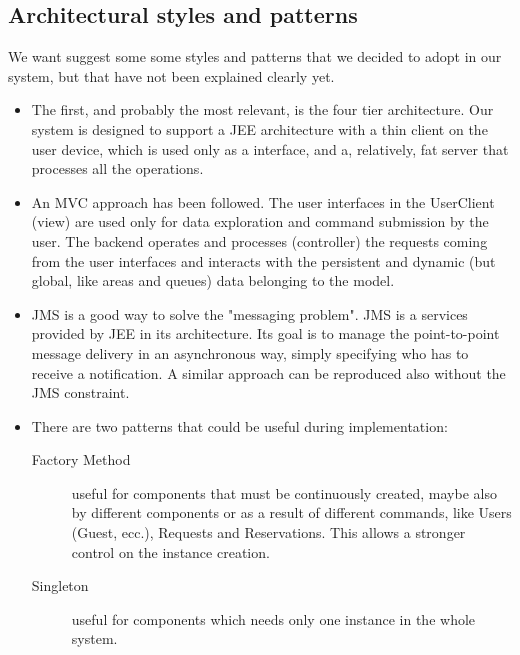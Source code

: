 	\subsection{Architectural styles and patterns}
	We want suggest some some styles and patterns that we decided to adopt in our system, but that have not been explained
	clearly yet.
	\begin{itemize}
		\item The first, and probably the most relevant, is the four tier architecture. Our system is designed to
		support a JEE architecture with a thin client on the user device, which is used only as a interface, and a,
		relatively, fat server that processes all the operations.
		\item An MVC approach has been followed. The user interfaces in the UserClient (view) are used only for
		data exploration and command submission by the user.
		The backend operates and processes (controller) the requests coming	from the user interfaces and interacts
		with the persistent and dynamic (but global, like areas and queues)	data belonging to the model.
		\item JMS is a good way to solve the "messaging problem". JMS is a services provided by JEE in its architecture.
		Its goal is to manage the point-to-point message delivery in an asynchronous way, simply specifying who
		has to receive a notification. A similar approach can be reproduced also without the JMS constraint.
		\item There are two patterns that could be useful during implementation:
		\begin{description}
			\item[Factory Method] useful for components that must be continuously created,
			maybe also by different components or as a result of different commands, like Users (Guest, ecc.),
			Requests and Reservations. This allows a stronger control on the instance creation.
			\item[Singleton] useful for components which needs only one instance in the whole system.
		\end{description}
	\end{itemize}
	
	